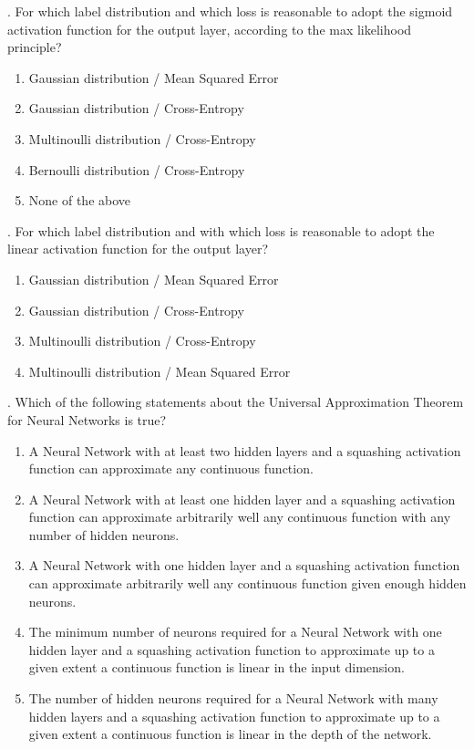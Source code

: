 . For which label distribution and which loss is reasonable to adopt the sigmoid activation function for the output layer, according to the max likelihood principle?

\begin{enumerate}[label=\roman*]
    \item Gaussian distribution / Mean Squared Error
    \item Gaussian distribution / Cross-Entropy
    \item Multinoulli distribution / Cross-Entropy
    \item Bernoulli distribution / Cross-Entropy
    \item None of the above
\end{enumerate}

. For which label distribution and with which loss is reasonable to adopt the linear activation function for the output layer?

\begin{enumerate}[label=\roman*]
    \item Gaussian distribution / Mean Squared Error
    \item Gaussian distribution / Cross-Entropy
    \item Multinoulli distribution / Cross-Entropy
    \item Multinoulli distribution / Mean Squared Error
\end{enumerate}

\newpage
{}. Which of the following statements about the Universal Approximation Theorem for Neural Networks is true? 

\begin{enumerate}[label=\roman*]
    \item A Neural Network with at least two hidden layers and a squashing activation function can approximate any continuous function.
    \item A Neural Network with at least one hidden layer and a squashing activation function can approximate arbitrarily well any continuous function with any number of hidden neurons.
    \item A Neural Network with one hidden layer and a squashing activation function can approximate arbitrarily well any continuous function given enough hidden neurons.
    \item The minimum number of neurons required for a Neural Network with one hidden layer and a squashing activation function to approximate up to a given extent a continuous function is linear in the input dimension.
    \item The number of hidden neurons required for a Neural Network with many hidden layers and a squashing activation function to approximate up to a given extent a continuous function is linear in the depth of the network.
\end{enumerate}

